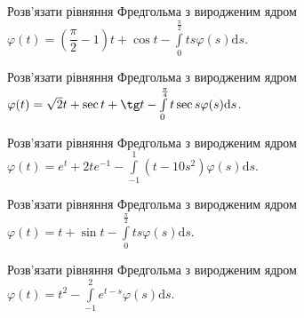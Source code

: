 \documentclass[12pt]{extarticle}
\begin{document}
\begin{Exercise}
Розв’язати рівняння Фредгольма з виродженим ядром $\varphi(t) = \left(\dfrac{\pi}{2}-1\right)t + \cos t - \int\limits_{0}^{\frac{\pi}{2}} ts \varphi(s) \mathrm{d}s$.
\end{Exercise}

\begin{Exercise}
Розв’язати рівняння Фредгольма з виродженим ядром $\varphi(t) = \sqrt{2} t + \sec t + \tg t - \int\limits_{0}^{\frac{\pi}{4}} t \sec s \varphi(s) \mathrm{d}s$.
\end{Exercise}

\begin{Exercise}
Розв’язати рівняння Фредгольма з виродженим ядром $\varphi(t) = e^t + 2te^{-1} - \int\limits_{-1}^{1} (t-10s^2) \varphi(s) \mathrm{d}s$.
\end{Exercise}

\begin{Exercise}
Розв’язати рівняння Фредгольма з виродженим ядром $\varphi(t) = t + \sin t - \int\limits_{0}^{\frac{\pi}{2}} ts \varphi(s) \mathrm{d}s$.
\end{Exercise}

\begin{Exercise}
Розв’язати рівняння Фредгольма з виродженим ядром $\varphi(t) = t^2 - \int\limits_{-1}^{2} e^{t-s} \varphi(s) \mathrm{d}s$.
\end{Exercise}
\end{document}
